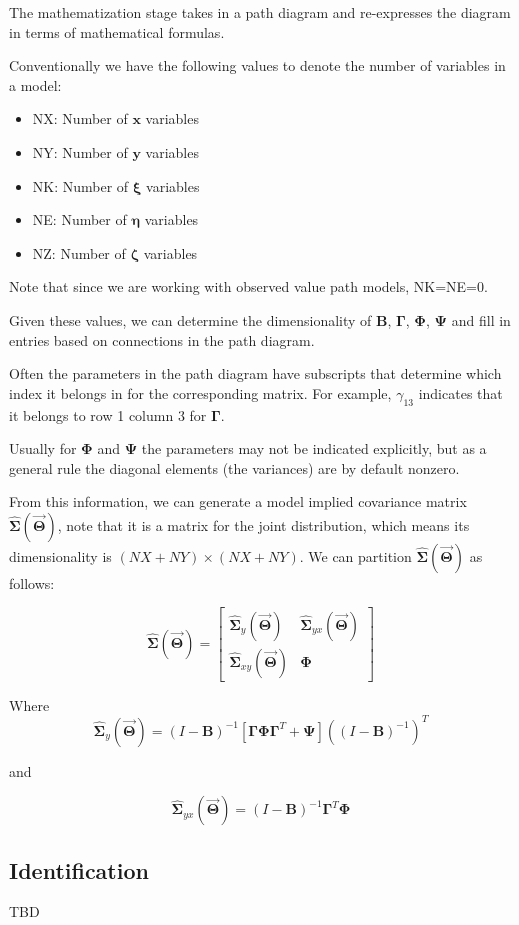 \documentclass{article}
\begin{document}
\begin{multicols*}{2}
The mathematization stage takes in a path diagram and re-expresses the diagram in terms of mathematical formulas.

Conventionally we have the following values to denote the number of variables in a model:

\begin{itemize}
    \item NX: Number of $\mathbf{x}$ variables
    \item NY: Number of $\mathbf{y}$ variables
    \item NK: Number of $\mathbf{\xi}$ variables
    \item NE: Number of $\mathbf{\eta}$ variables
    \item NZ: Number of $\mathbf{\zeta}$ variables
\end{itemize}

Note that since we are working with observed value path models, NK=NE=0.

Given these values, we can determine the dimensionality of $\mathbf{B}$, $\mathbf{\Gamma}$, $\mathbf{\Phi}$, $\mathbf{\Psi}$ and fill in entries based on connections in the path diagram. 

Often the parameters in the path diagram have subscripts that determine which index it belongs in for the corresponding matrix. For example, $\gamma_{13}$ indicates that it belongs to row 1 column 3 for $\mathbf{\Gamma}$.

Usually for $\mathbf{\Phi}$ and $\mathbf{\Psi}$ the parameters may not be indicated explicitly, but as a general rule the diagonal elements (the variances) are by default nonzero.

From this information, we can generate a model implied covariance matrix $\hat{\mathbf{\Sigma}}(\mathbf{\vec{\Theta}})$, note that it is a matrix for the joint distribution, which means its dimensionality is $(NX+NY) \times (NX+NY)$. We can partition $\hat{\mathbf{\Sigma}}(\mathbf{\vec{\Theta}})$ as follows:

\[
\hat{\mathbf{\Sigma}}(\mathbf{\vec{\Theta}}) = 
\left[
    \begin{array}{c|c}
        \hat{\mathbf{\Sigma}}_y(\mathbf{\vec{\Theta}}) & 
        \hat{\mathbf{\Sigma}}_{yx}(\mathbf{\vec{\Theta}})\\
        \hline
        \hat{\mathbf{\Sigma}}_{xy}(\mathbf{\vec{\Theta}}) &
        \mathbf{\Phi}
    \end{array}
\right]
\]

Where 
\[
\hat{\mathbf{\Sigma}}_y(\mathbf{\vec{\Theta}})
= (I - \mathbf{B})^{-1}
\left[
\mathbf{\Gamma}\mathbf{\Phi}\mathbf{\Gamma}^T 
+ \mathbf{\Psi}
\right]
((I - \mathbf{B})^{-1})^T
\]

and 

\[
\hat{\mathbf{\Sigma}}_{yx}(\mathbf{\vec{\Theta}})
= (I - \mathbf{B})^{-1}\mathbf{\Gamma}^T\mathbf{\Phi}
\]

\subsection{Identification}

TBD

\end{multicols*}
\end{document}
